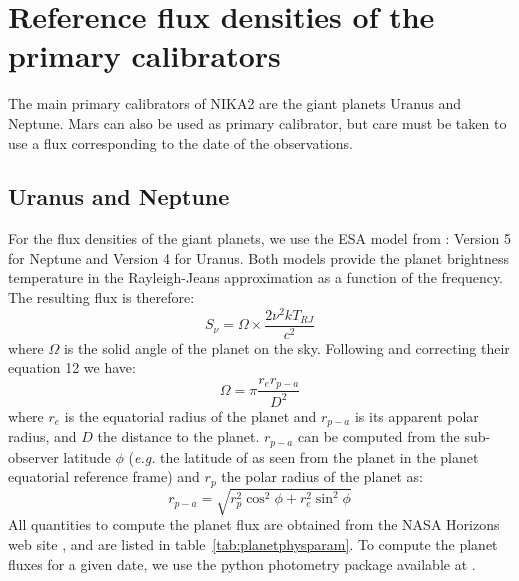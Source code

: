%
%


\section{Reference flux densities of the primary calibrators }%
\label{se:ref_flux_primaries}

The main primary calibrators of NIKA2 are the giant planets Uranus and
Neptune.  Mars can also be used as primary
calibrator, but care must be taken to use a flux corresponding to the
date of the observations.


\subsection{Uranus and Neptune}
\label{se:ref_flux_uranus_neptune}
For the flux densities of the giant planets, we use the ESA model from
\cite{ESAmodel}: Version 5 for Neptune and Version 4 for Uranus. 
Both models provide the planet brightness temperature in the
Rayleigh-Jeans approximation as a function of the frequency. The
resulting flux is therefore: 
\begin{equation}
S_{\nu} = \Omega \times \frac{2 \nu^{2} k T_{RJ}}{c^2}
\end{equation}
where $\Omega$ is the solid angle of the planet on the sky. Following
\cite{bendo2013} and correcting their equation 12 we have:
%
\begin{equation}
\Omega = \pi \frac{r_{e} r_{p-a}}{D^{2}} 
\label{eq:omega}
\end{equation}
where $r_{e}$ is the equatorial radius of the planet and $r_{p-a}$ is
its apparent polar radius, and $D$ the distance to the
planet. $r_{p-a}$ can be computed from the sub-observer latitude $\phi$
({\it e.g.} the latitude of  as seen from the planet in the
planet equatorial reference frame) and $r_{p}$ the polar radius of the
planet as:
\begin{equation}
r_{p-a} = \sqrt{r_{p}^2 \cos^{2}\phi + r_{e}^2 \sin^{2} \phi}
\end{equation}
All quantities to compute the planet flux are obtained from the NASA
Horizons web site \cite{NASAHorizon}, and are
listed in table~\ref{tab:planetphysparam}. To compute the planet fluxes for a given date, we use the python
photometry package available at \cite{gith-Haussel}.

